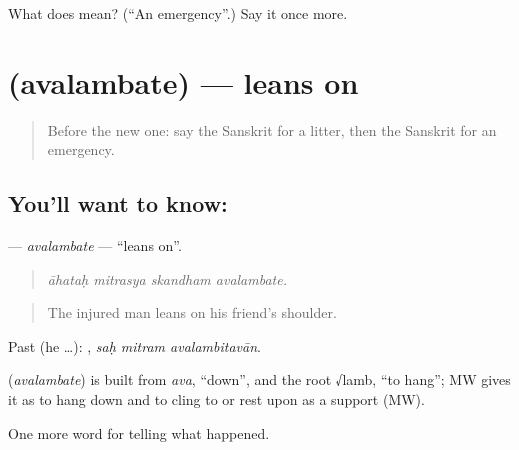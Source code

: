 \begin{tcolorbox}[breakable,colback=teal!4,colframe=teal!35!black,title={Before you move on}]
What does  mean? (\textquotedblleft{}An emergency\textquotedblright{}.) Say it once more.
\end{tcolorbox}
\section[\texorpdfstring{\sk{अवलम्बते} (avalambate)}{अवलम्बते (avalambate)}]{ (avalambate) — leans on}

\label{lesson:SA-C295-avalambate}



\begin{quote}
Before the new one: say the Sanskrit for a litter, then the Sanskrit for an emergency.
\end{quote}

\subsection*{You'll want to know: }
\textbf{} — \emph{avalambate} — \textquotedblleft{}leans on\textquotedblright{}.

\begin{quote}
   
\end{quote}

\begin{quote}
\emph{āhataḥ mitrasya skandham avalambate.}
\end{quote}

\begin{quote}
The injured man leans on his friend's shoulder.
\end{quote}

Past (he …):   , \emph{saḥ mitram avalambitavān}.

\begin{cousinweb}
\textbf{} (\emph{avalambate}) is built from \emph{ava}, \textquotedblleft{}down\textquotedblright{}, and the root √lamb, \textquotedblleft{}to hang\textquotedblright{}; MW gives it as to hang down and to cling to or rest upon as a support (MW).
\end{cousinweb}

\begin{grammarlens}[title={What you've built}]
One more word for telling what happened.
\end{grammarlens}

